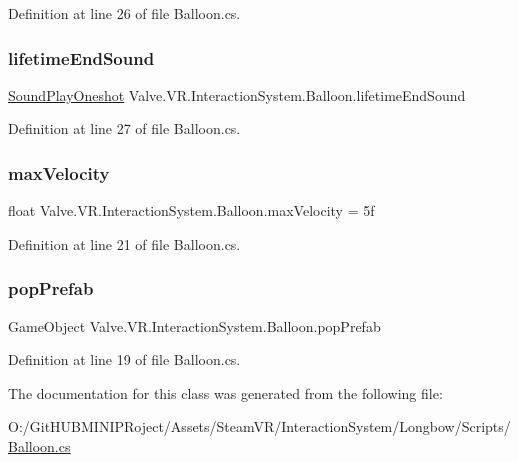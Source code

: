 Definition at line 26 of file Balloon.\+cs.

\mbox{\label{class_valve_1_1_v_r_1_1_interaction_system_1_1_balloon_ae2830c0c649967ba1017603f35814c9c}} 
\subsubsection{\texorpdfstring{lifetimeEndSound}{lifetimeEndSound}}
{\footnotesize\ttfamily \mbox{\hyperlink{class_valve_1_1_v_r_1_1_interaction_system_1_1_sound_play_oneshot}{Sound\+Play\+Oneshot}} Valve.\+V\+R.\+Interaction\+System.\+Balloon.\+lifetime\+End\+Sound}



Definition at line 27 of file Balloon.\+cs.

\mbox{\label{class_valve_1_1_v_r_1_1_interaction_system_1_1_balloon_a1b167d6871badba1b00841dd1da5c10a}} 
\subsubsection{\texorpdfstring{maxVelocity}{maxVelocity}}
{\footnotesize\ttfamily float Valve.\+V\+R.\+Interaction\+System.\+Balloon.\+max\+Velocity = 5f}



Definition at line 21 of file Balloon.\+cs.

\mbox{\label{class_valve_1_1_v_r_1_1_interaction_system_1_1_balloon_af1b5225b44a0d38b670ba83e12c62ea3}} 
\subsubsection{\texorpdfstring{popPrefab}{popPrefab}}
{\footnotesize\ttfamily Game\+Object Valve.\+V\+R.\+Interaction\+System.\+Balloon.\+pop\+Prefab}



Definition at line 19 of file Balloon.\+cs.



The documentation for this class was generated from the following file\+:\begin{DoxyCompactItemize}
\item 
O\+:/\+Git\+H\+U\+B\+M\+I\+N\+I\+P\+Roject/\+Assets/\+Steam\+V\+R/\+Interaction\+System/\+Longbow/\+Scripts/\mbox{\hyperlink{_balloon_8cs}{Balloon.\+cs}}\end{DoxyCompactItemize}
